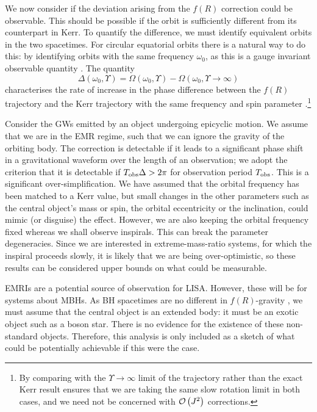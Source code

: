 We now consider if the deviation arising from the $f(R)$ correction could be observable. This should be possible if the orbit is sufficiently different from its counterpart in Kerr. To quantify the difference, we must identify equivalent orbits in the two spacetimes. For circular equatorial orbits there is a natural way to do this: by identifying orbits with the same frequency $\omega_0$, as this is a gauge invariant observable quantity \citep{Detweiler2008}. The quantity
\begin{equation}
\Delta(\omega_0,\Upsilon) = \Omega(\omega_0,\Upsilon) - \Omega(\omega_0,\Upsilon \rightarrow \infty)
\end{equation}
characterises the rate of increase in the phase difference between the $f(R)$ trajectory and the Kerr trajectory with the same frequency and spin parameter \citep{Berry2011}.\footnote{By comparing with the $\Upsilon \rightarrow\infty$ limit of the trajectory rather than the exact Kerr result ensures that we are taking the same slow rotation limit in both cases, and we need not be concerned with $\mathcal{O}\left({J^2}\right)$ corrections.}

Consider the GWs emitted by an object undergoing epicyclic motion. We assume that we are in the EMR regime, such that we can ignore the gravity of the orbiting body. The correction is detectable if it leads to a significant phase shift in a gravitational waveform over the length of an observation; we adopt the criterion that it is detectable if $T_\mathrm{obs}\Delta > 2\pi$ for observation period $T_\mathrm{obs}$. This is a significant over-simplification. We have assumed that the orbital frequency has been matched to a Kerr value, but small changes in the other parameters such as the central object's mass or spin, the orbital eccentricity or the inclination, could mimic (or disguise) the effect. However, we are also keeping the orbital frequency fixed whereas we shall observe inspirals. This can break the parameter degeneracies. Since we are interested in extreme-mass-ratio systems, for which the inspiral proceeds slowly, it is likely that we are being over-optimistic, so these results can be considered upper bounds on what could be measurable.

EMRIs are a potential source of observation for LISA. However, these will be for systems about MBHs. As BH spacetimes are no different in $f(R)$-gravity \citep{Psaltis2008, Sotiriou2011}, we must assume that the central object is an extended body: it must be an exotic object such as a boson star. There is no evidence for the existence of these non-standard objects. Therefore, this analysis is only included as a sketch of what could be potentially achievable if this were the case.


